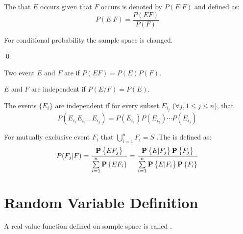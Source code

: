 \begin{definition}
    The  that $E$ occurs given that $F$ occurs is denoted by $P(E|F)$ and defined as:
    \begin{equation}
        P(E|F) = \frac{P(EF)}{P(F)}
    \end{equation}
    
    For conditional probability the sample space is changed.
    
    \qed
\end{definition}

\begin{definition}[independent]
    Two event $E$ and $F$ are  if $P(EF) = P(E) P(F)$.
\end{definition}

\begin{theorem}
    $E$ and $F$ are independent if $P(E/F) = P(E)$.    
\end{theorem}

\begin{definition}
    The events $\{ E_i \}$ are independent if for every subset $E_{i_j}$ ($ \forall j, 1 \leq j \leq n$), that
    \begin{equation}
        P(E_{i_1} E_{i_2} \dots E_{i_j}) = P(E_{i_1}) P(E_{i_2}) \cdots P(E_{i_j})
    \end{equation}
\end{definition}

\begin{definition}
    For mutually exclusive event $F_i$ that $\displaystyle \bigcup_{i=1}^n F_i = S$ .The  is defined as:
    \begin{equation}
    \displaystyle P(F_j | F) = \frac{\mathop{\bf P\/}\displaystyle \left\{EF_j\right\}}{\sum\limits_{i=1}^n \mathop{\bf P\/}\displaystyle \left\{EF_i\right\}} = \frac{\mathop{\bf P\/}\displaystyle \left\{E|F_j\right\} \mathop{\bf P\/}\displaystyle \left\{F_j\right\}}{\sum\limits_{i=1}^n \mathop{\bf P\/}\displaystyle \left\{E|F_i\right\} \mathop{\bf P\/}\displaystyle \left\{F_i\right\}}
    \end{equation}
\end{definition}




\section{Random Variable Definition}

\begin{definition}
    A real value function defined on sample space is called .
\end{definition}

